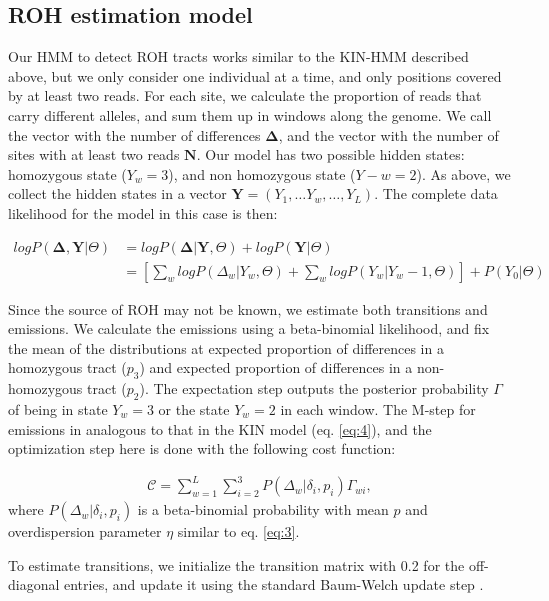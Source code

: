 \documentclass[12pt, letterpaper]{article}
\begin{document}
\subsection{ROH estimation model}\label{roh}
Our HMM to detect ROH tracts works similar to the KIN-HMM described above, but we only consider one individual at a time, and only positions covered by at least two reads. For each site, we calculate the proportion of reads that carry different alleles, and sum them up in windows along the genome. We call the vector with the number of differences $\mathbf{\Delta}$, and the vector with the number of sites with at least two reads $\mathbf{N}$. Our model has two possible hidden states: homozygous state ($Y_w=3$), and non homozygous state ($Y-w=2$). As above, we collect the hidden states in a vector $\mathbf{Y} = (Y_1, \dots Y_w, \dots, Y_L)$. The complete data likelihood for the model in this case is then:

\begin{align}\label{eq:10}
    log P(\mathbf{\Delta},\mathbf{Y}|\Theta) &= log P(\mathbf{\Delta}|\mathbf{Y},\Theta) + log P(\mathbf{Y}|\Theta)\nonumber\\
 &= [\sum_{w} log P(\Delta_w|Y_w, \Theta) + \sum_{w} log P(Y_w|Y_w-1, \Theta)] + P(Y_0| \Theta)
\end{align}

Since the source of ROH may not be known,  we estimate both transitions and emissions. We calculate the emissions using a beta-binomial likelihood, and fix the mean of the distributions at expected proportion of differences in a homozygous tract ($p_3$) and expected proportion of differences in a non-homozygous tract ($p_2$). The expectation step outputs the posterior probability $\Gamma$ of being in state $Y_w=3$ or the state $Y_w=2$ in each window. The M-step for emissions in analogous to that in the KIN model (eq. \ref{eq:4}), and the optimization step here is done with the following cost function:

\begin{align}\label{eq:11}
\mathcal{C} = \sum_{w=1}^L \sum_{i=2}^3 P(\Delta_w|\delta_{i},p_{i}) \Gamma_{wi} ,
\end{align}
where $P(\Delta_w|\delta_{i},p_{i})$ is a beta-binomial probability with mean $p$ and overdispersion parameter $\eta$ similar to eq. \ref{eq:3}.

To estimate transitions, we initialize the transition matrix with 0.2 for the off-diagonal entries, and update it using the standard Baum-Welch update step \cite{baum_maximization_1970}.
\end{document}
